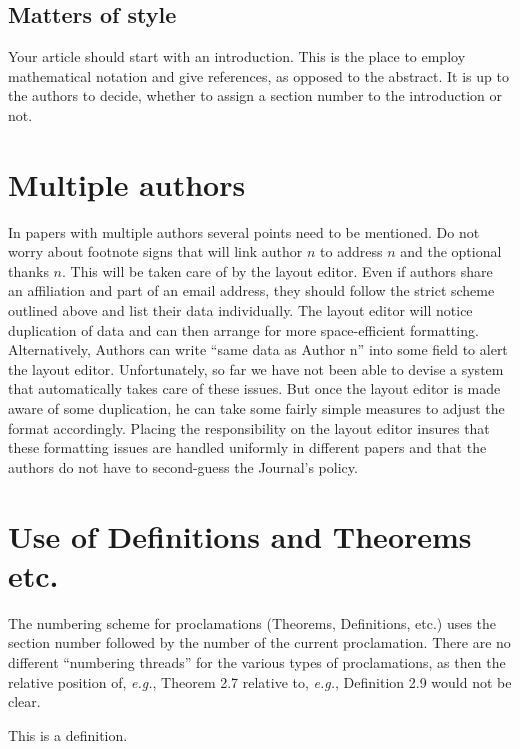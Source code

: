 \documentclass{CSLM} %
\theoremstyle{plain}\newtheorem{satz}[thm]{Satz} %
\def\eg{{\em e.g.}}
\begin{document}
\subsection*{Matters of style}

  Your article should start with an introduction.  This is the place
  to employ mathematical notation and give references, as opposed to
  the abstract.  It is up to the authors to decide, whether to assign
  a section number to the introduction or not.

\section{Multiple authors}

  In papers with multiple authors several points need to be mentioned.
  Do not worry about footnote signs that will link author $n$ to
  address $n$ and the optional thanks $n$.  This will be taken care of
  by the layout editor.  Even if authors share an affiliation and part
  of an email address, they should follow the strict scheme outlined
  above and list their data individually.  The layout editor will
  notice duplication of data and can then arrange for more
  space-efficient formatting.  Alternatively, Authors can write ``same
  data as Author n'' into some field to alert the layout editor.
  Unfortunately, so far we have not been able to devise a system that
  automatically takes care of these issues.  But once the layout
  editor is made aware of some duplication, he can take some fairly
  simple measures to adjust the format accordingly.  Placing the
  responsibility on the layout editor insures that these formatting
  issues are handled uniformly in different papers and that the
  authors do not have to second-guess the Journal's policy.

\section{Use of  Definitions and Theorems etc.}

  The numbering scheme for proclamations (Theorems, Definitions, etc.)
  uses the section number followed by the number of the current
  proclamation.  There are no different ``numbering threads'' for the
  various types of proclamations, as then the relative position of,
  \eg, Theorem 2.7 relative to, \eg, Definition 2.9 would not be clear.

\begin{defi}\label{D:first}
  This is a definition.
\end{defi}
\end{document}
